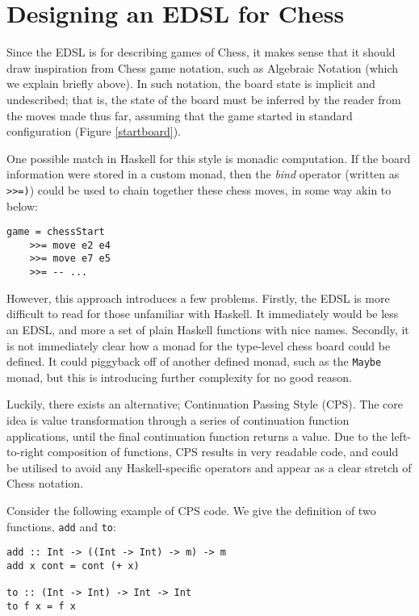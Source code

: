 \documentclass[12pt, a4paper, bibliography=totocnumbered]{scrreprt}
\newcommand{\inline}[1]{\lstinline[basicstyle=\ttfamily\footnotesize]{#1}}
\begin{document}
\section{Designing an EDSL for Chess}

Since the EDSL is for describing games of Chess, it makes sense that it should draw inspiration from Chess game notation, such as Algebraic Notation (which we explain briefly above). In such notation, the board state is implicit and undescribed; that is, the state of the board must be inferred by the reader from the moves made thus far, assuming that the game started in standard configuration (Figure \ref{startboard}).

One possible match in Haskell for this style is monadic computation. If the board information were stored in a custom monad, then the \emph{bind} operator (written as \inline{>>=)}) could be used to chain together these chess moves, in some way akin to below:

\begin{lstlisting}
game = chessStart
    >>= move e2 e4
    >>= move e7 e5
    >>= -- ...
\end{lstlisting}

However, this approach introduces a few problems. Firstly, the EDSL is more difficult to read for those unfamiliar with Haskell. It immediately would be less an EDSL, and more a set of plain Haskell functions with nice names. Secondly, it is not immediately clear how a monad for the type-level chess board could be defined. It could piggyback off of another defined monad, such as the \inline{Maybe} monad, but this is introducing further complexity for no good reason.

Luckily, there exists an alternative; Continuation Passing Style (CPS). The core idea is value transformation through a series of continuation function applications, until the final continuation function returns a value. Due to the left-to-right composition of functions, CPS results in very readable code, and could be utilised to avoid any Haskell-specific operators and appear as a clear stretch of Chess notation.

Consider the following example of CPS code. We give the definition of two functions, \inline{add} and \inline{to}:

\begin{lstlisting}
add :: Int -> ((Int -> Int) -> m) -> m
add x cont = cont (+ x)

to :: (Int -> Int) -> Int -> Int
to f x = f x
\end{lstlisting}
\end{document}
